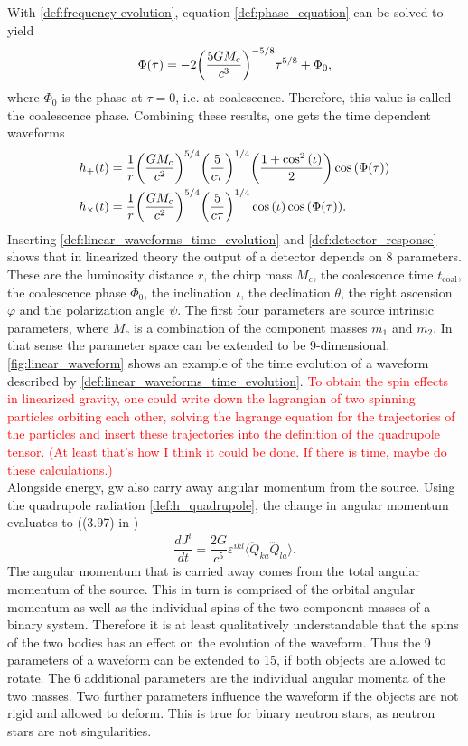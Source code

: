 With \eqref{def:frequency evolution}, equation \eqref{def:phase_equation} can be solved to yield
\begin{equation}
\Phi{\left( \tau \right)}=-2{\left( \frac{5 G M_c}{c^3} \right)}^{-5/8}\tau^{5/8}+\Phi_0,
\end{equation}
where $\Phi_0$ is the phase at $\tau=0$, i.e. at coalescence. Therefore, this value is called the coalescence phase. Combining these results, one gets the time dependent waveforms
\begin{align}\label{def:linear_waveforms_time_evolution}
h_+{\left( t \right)} & = \frac{1}{r}{\left( \frac{G M_c}{c^2} \right)}^{5/4}{\left( \frac{5}{c\tau} \right)}^{1/4}{\left( \frac{1+\cos^2{\left( \iota \right)}}{2} \right)}\cos{\left( \Phi{\left( \tau \right)} \right)}\nonumber\\
h_\times{\left( t \right)} & = \frac{1}{r}{\left( \frac{G M_c}{c^2} \right)}^{5/4}{\left( \frac{5}{c\tau} \right)}^{1/4}\cos{\left( \iota \right)}\cos{\left( \Phi{\left( \tau \right)} \right)}.
\end{align}
Inserting \eqref{def:linear_waveforms_time_evolution} and \eqref{def:detector_response} shows that in linearized theory the output of a detector depends on 8 parameters. These are the luminosity distance $r$, the chirp mass $M_c$, the coalescence time $t_\text{coal}$, the coalescence phase $\Phi_0$, the inclination $\iota$, the declination $\theta$, the right ascension $\varphi$ and the polarization angle $\psi$. The first four parameters are source intrinsic parameters, where $M_c$ is a combination of the component masses $m_1$ and $m_2$. In that sense the parameter space can be extended to be 9-dimensional.\\
\autoref{fig:linear_waveform} shows an example of the time evolution of a waveform described by \eqref{def:linear_waveforms_time_evolution}. \textcolor{red}{To obtain the spin effects in linearized gravity, one could write down the lagrangian of two spinning particles orbiting each other, solving the lagrange equation for the trajectories of the particles and insert these trajectories into the definition of the quadrupole tensor. (At least that's how I think it could be done. If there is time, maybe do these calculations.)}\\
Alongside energy, \gls{gw} also carry away angular momentum from the source. Using the quadrupole radiation \eqref{def:h_quadrupole}, the change in angular momentum evaluates to ((3.97) in \cite{gwv1})
\begin{equation}
\frac{dJ^i}{dt}=\frac{2G}{c^5}\varepsilon^{ikl}\langle \ddot{Q}_{ka}\dddot{Q}_{la}\rangle .
\end{equation}
The angular momentum that is carried away comes from the total angular momentum of the source. This in turn is comprised of the orbital angular momentum as well as the individual spins of the two component masses of a binary system. Therefore it is at least qualitatively understandable that the spins of the two bodies has an effect on the evolution of the waveform. Thus the 9 parameters of a waveform can be extended to 15, if both objects are allowed to rotate. The 6 additional parameters are the individual angular momenta of the two masses. Two further parameters influence the waveform if the objects are not rigid and allowed to deform. This is true for binary neutron stars, as neutron stars are not singularities.\\
